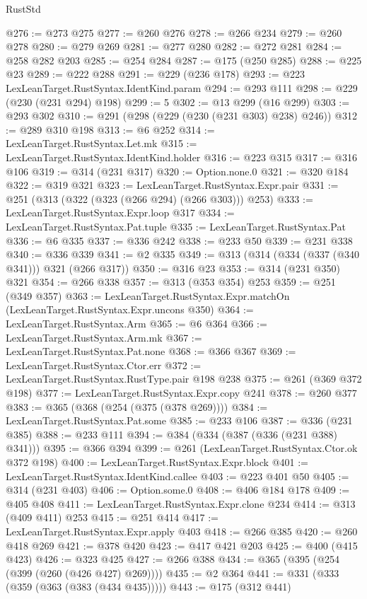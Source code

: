 \begin{lexlean}{RustStd}
\begin{coremodule}
@276 := @273 @275
@277 := @260 @276
@278 := @266 @234
@279 := @260 @278
@280 := @279 @269
@281 := @277 @280
@282 := @272 @281
@284 := @258 @282 @203
@285 := @254 @284
@287 := @175 (@250 @285)
@288 := @225 @23
@289 := @222 @288
@291 := @229 (@236 @178)
@293 := @223 LexLeanTarget.RustSyntax.IdentKind.param
@294 := @293 @111
@298 := @229 (@230 (@231 @294) @198)
@299 := 5
@302 := @13 @299 (@16 @299)
@303 := @293 @302
@310 := @291 (@298 (@229 (@230 (@231 @303) @238) @246))
@312 := @289 @310 @198
@313 := @6 @252
@314 := LexLeanTarget.RustSyntax.Let.mk
@315 := LexLeanTarget.RustSyntax.IdentKind.holder
@316 := @223 @315
@317 := @316 @106
@319 := @314 (@231 @317)
@320 := Option.none.{0}
@321 := @320 @184
@322 := @319 @321
@323 := LexLeanTarget.RustSyntax.Expr.pair
@331 := @251 (@313 (@322 (@323 (@266 @294) (@266 @303))) @253)
@333 := LexLeanTarget.RustSyntax.Expr.loop @317
@334 := LexLeanTarget.RustSyntax.Pat.tuple
@335 := LexLeanTarget.RustSyntax.Pat
@336 := @6 @335
@337 := @336 @242
@338 := @233 @50
@339 := @231 @338
@340 := @336 @339
@341 := @2 @335
@349 := @313 (@314 (@334 (@337 (@340 @341))) @321 (@266 @317))
@350 := @316 @23
@353 := @314 (@231 @350) @321
@354 := @266 @338
@357 := @313 (@353 @354) @253
@359 := @251 (@349 @357)
@363 := LexLeanTarget.RustSyntax.Expr.matchOn (LexLeanTarget.RustSyntax.Expr.uncons @350)
@364 := LexLeanTarget.RustSyntax.Arm
@365 := @6 @364
@366 := LexLeanTarget.RustSyntax.Arm.mk
@367 := LexLeanTarget.RustSyntax.Pat.none
@368 := @366 @367
@369 := LexLeanTarget.RustSyntax.Ctor.err
@372 := LexLeanTarget.RustSyntax.RustType.pair @198 @238
@375 := @261 (@369 @372 @198)
@377 := LexLeanTarget.RustSyntax.Expr.copy @241
@378 := @260 @377
@383 := @365 (@368 (@254 (@375 (@378 @269))))
@384 := LexLeanTarget.RustSyntax.Pat.some
@385 := @233 @106
@387 := @336 (@231 @385)
@388 := @233 @111
@394 := @384 (@334 (@387 (@336 (@231 @388) @341)))
@395 := @366 @394
@399 := @261 (LexLeanTarget.RustSyntax.Ctor.ok @372 @198)
@400 := LexLeanTarget.RustSyntax.Expr.block
@401 := LexLeanTarget.RustSyntax.IdentKind.callee
@403 := @223 @401 @50
@405 := @314 (@231 @403)
@406 := Option.some.{0}
@408 := @406 @184 @178
@409 := @405 @408
@411 := LexLeanTarget.RustSyntax.Expr.clone @234
@414 := @313 (@409 @411) @253
@415 := @251 @414
@417 := LexLeanTarget.RustSyntax.Expr.apply @403
@418 := @266 @385
@420 := @260 @418 @269
@421 := @378 @420
@423 := @417 @421 @203
@425 := @400 (@415 @423)
@426 := @323 @425
@427 := @266 @388
@434 := @365 (@395 (@254 (@399 (@260 (@426 @427) @269))))
@435 := @2 @364
@441 := @331 (@333 (@359 (@363 (@383 (@434 @435)))))
@443 := @175 (@312 @441)

\end{coremodule}
\end{lexlean}
